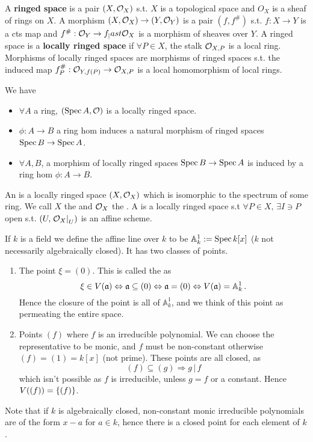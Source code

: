 \documentclass{article}
\begin{document}
\begin{definition}
	A \textbf{ringed space} is a pair $(X, \mathcal{O}_X)$ s.t. $X$ is a topological space and $O_X$ is a sheaf of rings on $X$. A morphism $(X, \mathcal{O}_X) \to (Y, \mathcal{O}_Y)$ is a pair $(f, f^\#)$ s.t. $f:X \to Y$ is a cts map and $f^\# : \mathcal{O}_Y \to f_|ast \mathcal{O}_X$ is a morphism of sheaves over $Y$. A ringed space is a \textbf{locally ringed space} if $\forall P \in X$, the stalk $\mathcal{O}_{X, P}$ is a local ring. Morphisms of locally ringed spaces are morphisms of ringed spaces s.t. the induced map $f_P^\# : \mathcal{O}_{Y, f(P)} \to \mathcal{O}_{X, P}$ is a local homomorphism of local rings. 
\end{definition}

\begin{prop}
	We have 
	\begin{itemize}
		\item $\forall A$ a ring, $(\operatorname{Spec} A, \mathcal{O})$ is a locally ringed space.
		\item $\phi:A \to B$ a ring hom induces a natural morphism of ringed spaces $\operatorname{Spec} B \to \operatorname{Spec} A$. 
		\item $\forall A,B$, a morphism of locally ringed spaces $\operatorname{Spec} B \to \operatorname{Spec} A$ is induced by a ring hom $\phi: A \to B$. 
	\end{itemize}
\end{prop}

\begin{definition}
	An  is a locally ringed space $(X, \mathcal{O}_X)$ which is isomorphic to the spectrum of some ring. We call $X$ the  and $\mathcal{O}_X$ the . A  is a locally ringed space s.t $\forall P \in X, \, \exists I \ni P$ open s.t. $(U, \left. \mathcal{O}_X \right\rvert_{U})$ is an affine scheme. 
\end{definition}

\begin{example}
	If $k$ is a field we define the affine line over $k$ to be $\mathbb{A}_k^1 := \operatorname{Spec} k[x]$ ($k$ not necessarily algebraically closed). It has two classes of points.
	\begin{enumerate}
		\item The point $\xi=(0)$. This is called the  as 
		\[
		\xi \in V(\mathfrak{a}) \Leftrightarrow \mathfrak{a} \subseteq (0) \Leftrightarrow \mathfrak{a}=(0) \Leftrightarrow V(\mathfrak{a}) = \mathbb{A}_k^1 \, .
		\]
		Hence the closure of the point is all of $\mathbb{A}_k^1$, and we think of this point as permeating the entire space.
		\item Points $(f)$ where $f$ is an irreducible polynomial. We can choose the representative to be monic, and $f$ must be non-constant otherwise $(f)=(1)=k[x]$ (not prime). These points are all closed, as 
		\[
		(f) \subseteq (g) \Rightarrow g \, | \, f 
		\] 
		which isn't possible as $f$ is irreducible, unless $g=f$ or a constant. Hence $V((f)) = \left\{ (f) \right\}$. 
	\end{enumerate}
Note that if $k$ is algebraically closed, non-constant monic irreducible polynomials are of the form $x-a$ for $a \in k$, hence there is a closed point for each element of $k$. 
\end{example}
\end{document}
